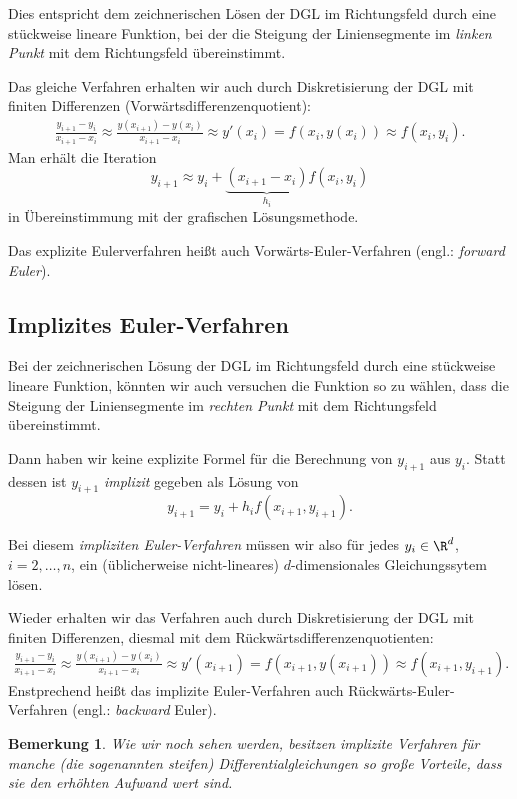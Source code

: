 \documentclass[
]{mycourse}
\theoremstyle{mythm}
\newtheorem{bemerkung}[theorem]{Bemerkung}
\theoremstyle{break}
\begin{document}
Dies entspricht dem zeichnerischen Lösen der DGL im Richtungsfeld durch eine stückweise lineare Funktion,
bei der die Steigung der Liniensegmente im \emph{linken Punkt} mit dem Richtungsfeld übereinstimmt.

Das gleiche Verfahren erhalten wir auch durch Diskretisierung der DGL mit finiten Differenzen (Vorwärtsdifferenzenquotient):
\begin{align*}
\frac{y_{i+1}-y_i}{x_{i+1}-x_i}
\approx \frac{y(x_{i+1})-y(x_{i})}{x_{i+1}-x_i} \approx y'(x_i)= f(x_i,y(x_i))\approx f(x_i,y_i).
\end{align*}
Man erhält die Iteration
\[
	y_{i+1} \approx y_i + \underbrace{(x_{i+1} - x_{i})}_{h_i} f(x_i, y_i)
\]
in Übereinstimmung mit der grafischen Lösungsmethode.

Das explizite Eulerverfahren heißt auch Vorwärts-Euler-Verfahren (engl.: \emph{forward Euler}).


\subsection{Implizites Euler-Verfahren}

Bei der zeichnerischen Lösung der DGL im Richtungsfeld durch eine stückweise lineare Funktion,
könnten wir auch versuchen die Funktion so zu wählen, dass die Steigung der Liniensegmente
im \emph{rechten Punkt} mit dem Richtungsfeld übereinstimmt.

Dann haben wir keine explizite Formel für die Berechnung von $y_{i+1}$ aus $y_i$.
Statt dessen ist $y_{i+1}$ \emph{implizit} gegeben als Lösung von 
\[
y_{i+1} = y_i+h_i f(x_{i+1},y_{i+1}).
\]

Bei diesem \emph{impliziten Euler-Verfahren} müssen wir also für jedes $y_i\in \R^d$, $i=2,\ldots,n$,
ein (üblicherweise nicht-lineares) $d$-dimensionales Gleichungssytem lösen.

Wieder erhalten wir das Verfahren auch durch Diskretisierung der DGL mit finiten Differenzen, diesmal mit 
dem Rückwärtsdifferenzenquotienten:
\begin{align*}
\frac{y_{i+1}-y_i}{x_{i+1}-x_i}
\approx \frac{y(x_{i+1})-y(x_{i})}{x_{i+1}-x_i} \approx y'(x_{i+1})= f(x_{i+1},y(x_{i+1}))\approx f(x_{i+1},y_{i+1}).
\end{align*}
Enstprechend heißt das implizite Euler-Verfahren auch Rückwärts-Euler-Ver\-fah\-ren (engl.: \emph{backward} Euler).

\begin{bemerkung}
Wie wir noch sehen werden, besitzen implizite Verfahren für manche (die sogenannten \emph{steifen}) Differentialgleichungen so große Vorteile, dass sie den erhöhten Aufwand wert sind.
\end{bemerkung}
\end{document}
